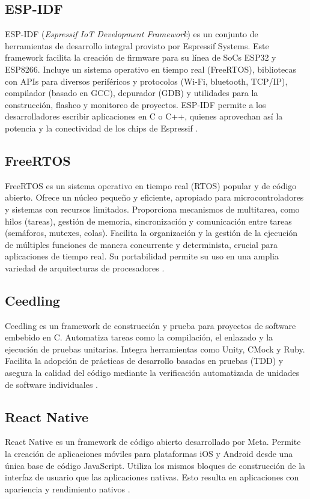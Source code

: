 \subsection{ESP-IDF}

ESP-IDF (\textit{Espressif IoT Development Framework}) es un conjunto de herramientas de desarrollo integral provisto por Espressif Systems. Este framework facilita la creación de firmware para su línea de SoCs ESP32 y ESP8266. Incluye un sistema operativo en tiempo real (FreeRTOS), bibliotecas con APIs para diversos periféricos y protocolos (Wi-Fi, bluetooth, TCP/IP), compilador (basado en GCC), depurador (GDB) y utilidades para la construcción, flasheo y monitoreo de proyectos. ESP-IDF permite a los desarrolladores escribir aplicaciones en C o C++, quienes aprovechan así la potencia y la conectividad de los chips de Espressif \cite{ESPIDF}.


\subsection{FreeRTOS}

FreeRTOS es un sistema operativo en tiempo real (RTOS) popular y de código abierto. Ofrece un núcleo pequeño y eficiente, apropiado para microcontroladores y sistemas con recursos limitados. Proporciona mecanismos de multitarea, como hilos (tareas), gestión de memoria, sincronización y comunicación entre tareas (semáforos, mutexes, colas). Facilita la organización y la gestión de la ejecución de múltiples funciones de manera concurrente y determinista, crucial para aplicaciones de tiempo real. Su portabilidad permite su uso en una amplia variedad de arquitecturas de procesadores \cite{FREERTOS}.

\subsection{Ceedling}

Ceedling es un framework de construcción y prueba para proyectos de software embebido en C. Automatiza tareas como la compilación, el enlazado y la ejecución de pruebas unitarias. Integra herramientas como Unity, CMock y Ruby. Facilita la adopción de prácticas de desarrollo basadas en pruebas (TDD) y asegura la calidad del código mediante la verificación automatizada de unidades de software individuales \cite{CEEDLING}.

\subsection{React Native}
React Native es un framework de código abierto desarrollado por Meta. Permite la creación de aplicaciones móviles para plataformas iOS y Android desde una única base de código JavaScript. Utiliza los mismos bloques de construcción de la interfaz de usuario que las aplicaciones nativas. Esto resulta en aplicaciones con apariencia y rendimiento nativos \cite{reactnative}.

